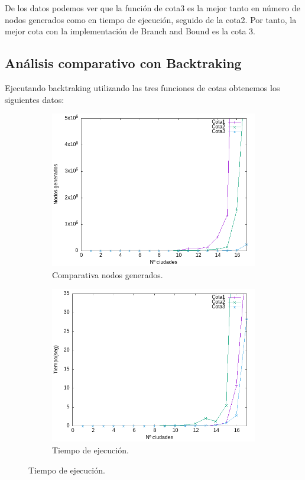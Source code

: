 \documentclass{article}
\begin{document}
De los datos podemos ver que la función de cota3 es la mejor tanto en número de nodos generados como en tiempo de ejecución, seguido de la cota2.
Por tanto, la mejor cota con la implementación de Branch and Bound es la cota 3. 

\subsection{Análisis comparativo con Backtraking}

Ejecutando backtraking utilizando las tres funciones de cotas obtenemos los siguientes datos: 

\begin{figure}[H]
    \centering
    \begin{subfigure}[b]{0.45\textwidth}
        \centering
        \includegraphics[width=\textwidth]{Sucio_Olga/img/Comparativa_nodos_BK_linespointsAcotado.png}
        \caption{Comparativa nodos generados.}
    \end{subfigure}
    \begin{subfigure}[b]{0.45\textwidth}
        \centering
        \includegraphics[width=\textwidth]{Sucio_Olga/img/Comparativa_tiempos_BK_linespointsAcotado.png}
        \caption{Tiempo de ejecución.}
    \end{subfigure}
\end{figure} 
\end{document}
